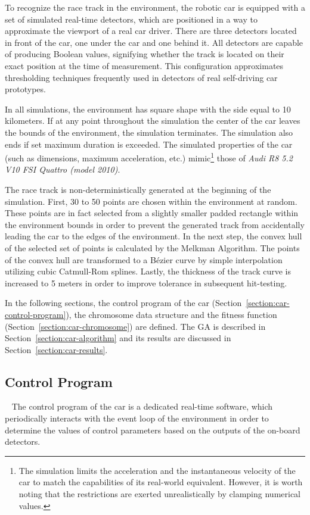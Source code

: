To recognize the race track in the environment, the robotic car is equipped with a set of simulated real-time detectors, which are positioned in a way to approximate the viewport of a real car driver. There are three detectors located in front of the car, one under the car and one behind it. All detectors are capable of producing Boolean values, signifying whether the track is located on their exact position at the time of measurement. This configuration approximates thresholding techniques frequently used in detectors of real self-driving car prototypes.

In all simulations, the environment has square shape with the side equal to 10 kilometers. If at any point throughout the simulation the center of the car leaves the bounds of the environment, the simulation terminates. The simulation also ends if set maximum duration is exceeded. The simulated properties of the car (such as dimensions, maximum acceleration, etc.) mimic\footnote{The simulation limits the acceleration and the instantaneous velocity of the car to match the capabilities of its real-world equivalent. However, it is worth noting that the restrictions are exerted unrealistically by clamping numerical values.} those of \textit{Audi R8 5.2 V10 FSI Quattro (model 2010)}.

The race track is non-deterministically generated at the beginning of the simulation. First, 30 to 50 points are chosen within the environment at random. These points are in fact selected from a slightly smaller padded rectangle within the environment bounds in order to prevent the generated track from accidentally leading the car to the edges of the environment. In the next step, the convex hull of the selected set of points is calculated by the Melkman Algorithm. \cite{MelkmanConvexHull} The points of the convex hull are transformed to a Bézier curve by simple interpolation utilizing cubic Catmull-Rom splines. \cite{CatmullRomSplines} Lastly, the thickness of the track curve is increased to 5 meters in order to improve tolerance in subsequent hit-testing.

In the following sections, the control program of the car (Section~\ref{section:car-control-program}), the chromosome data structure and the fitness function (Section~\ref{section:car-chromosome}) are defined. The GA is described in Section~\ref{section:car-algorithm} and its results are discussed in Section~\ref{section:car-results}.

\subsection{Control Program}~\label{section:car-control-program}
The control program of the car is a dedicated real-time software, which periodically interacts with the event loop of the environment in order to determine the values of control parameters based on the outputs of the on-board detectors.

